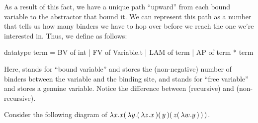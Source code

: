 \documentclass[11pt]{article}
\begin{document}
As a result of this fact, we have a unique path ``upward'' from each bound variable to the abstractor that bound it.
We can represent this path as a number that tells us how many binders we have to hop over before we reach the one we're interested in.
Thus, we define  as follows:
\begin{codeblock}
  datatype term
    = BV of int
    | FV of Variable.t
    | LAM of term
    | AP of term * term
\end{codeblock}
Here,  stands for ``bound variable'' and stores the (non-negative) number of binders between the variable and the binding site, and  stands for ``free variable'' and stores a genuine variable.
Notice the difference between  (recursive) and  (non-recursive).

Consider the following diagram of $\lambda{x}{.}{{x}\ensuremath{\mathtt{(}}\,\lambda{y}{.}{{{\ensuremath{\mathtt{(}}\,\lambda{z}{.}{x}\,\ensuremath{\mathtt{)}}}\ensuremath{\mathtt{(}}\,y\,\ensuremath{\mathtt{)}}}\ensuremath{\mathtt{(}}\,{z}\ensuremath{\mathtt{(}}\,\lambda{w}{.}{y}\,\ensuremath{\mathtt{)}}\,\ensuremath{\mathtt{)}}}\,\ensuremath{\mathtt{)}}}$.


\begin{center}
\end{center}
\end{document}
